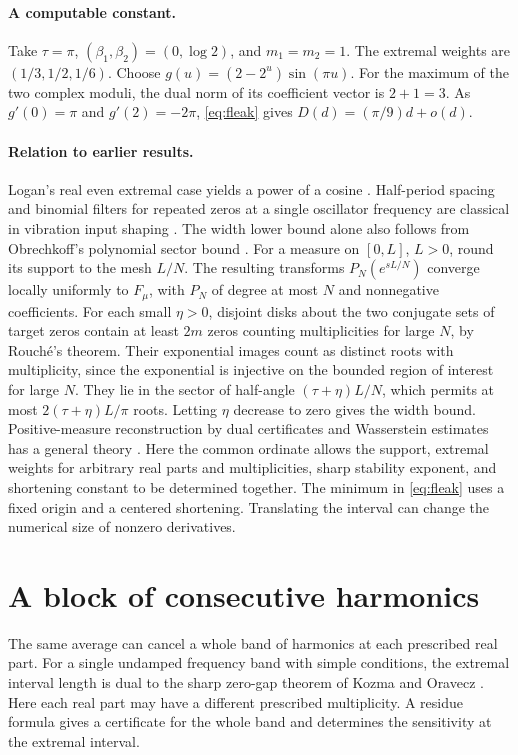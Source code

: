 \documentclass[11pt,letterpaper]{article}
\theoremstyle{remark}\newtheorem{remark}[theorem]{Remark}
\begin{document}
\paragraph{A computable constant.}
Take $\tau=\pi$, $(\beta_1,\beta_2)=(0,\log 2)$, and $m_1=m_2=1$. The extremal weights are $(1/3,1/2,1/6)$. Choose $g(u)=(2-2^u)\sin(\pi u)$. For the maximum of the two complex moduli, the dual norm of its coefficient vector is $2+1=3$. As $g'(0)=\pi$ and $g'(2)=-2\pi$, \eqref{eq:fleak} gives $D(d)=(\pi/9)d+o(d)$.

\paragraph{Relation to earlier results.}
Logan's real even extremal case yields a power of a cosine \cite{logan}. Half-period spacing and binomial filters for repeated zeros at a single oscillator frequency are classical in vibration input shaping \cite{kang,singhose}. The width lower bound alone also follows from Obrechkoff's polynomial sector bound \cite{obre}. For a measure on $[0,L]$, $L>0$, round its support to the mesh $L/N$. The resulting transforms $P_N(e^{sL/N})$ converge locally uniformly to $F_\mu$, with $P_N$ of degree at most $N$ and nonnegative coefficients. For each small $\eta>0$, disjoint disks about the two conjugate sets of target zeros contain at least $2m$ zeros counting multiplicities for large $N$, by Rouch\'e's theorem. Their exponential images count as distinct roots with multiplicity, since the exponential is injective on the bounded region of interest for large $N$. They lie in the sector of half-angle $(\tau+\eta)L/N$, which permits at most $2(\tau+\eta)L/\pi$ roots. Letting $\eta$ decrease to zero gives the width bound. Positive-measure reconstruction by dual certificates and Wasserstein estimates has a general theory \cite{eft}. Here the common ordinate allows the support, extremal weights for arbitrary real parts and multiplicities, sharp stability exponent, and shortening constant to be determined together. The minimum in \eqref{eq:fleak} uses a fixed origin and a centered shortening. Translating the interval can change the numerical size of nonzero derivatives.


\section{A block of consecutive harmonics}\label{sec:harmonics}

The same average can cancel a whole band of harmonics at each prescribed real part. For a single undamped frequency band with simple conditions, the extremal interval length is dual to the sharp zero-gap theorem of Kozma and Oravecz \cite{kozma}. Here each real part may have a different prescribed multiplicity. A residue formula gives a certificate for the whole band and determines the sensitivity at the extremal interval.
\end{document}
